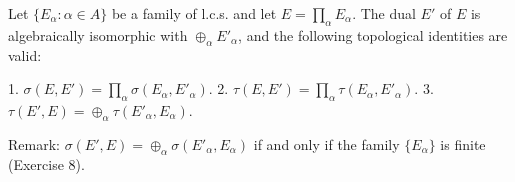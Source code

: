 Let $\{E_\alpha : \alpha \in A\}$ be a family of l.c.s. and let $E = \prod_\alpha E_\alpha$. The dual $E'$ of $E$ is algebraically isomorphic with $\oplus_\alpha E'_\alpha$, and the following topological identities are valid:

1. $\sigma(E, E') = \prod_\alpha \sigma(E_\alpha, E'_\alpha)$.
2. $\tau(E, E') = \prod_\alpha \tau(E_\alpha, E'_\alpha)$.
3. $\tau(E', E) = \oplus_\alpha \tau(E'_\alpha, E_\alpha)$.

Remark: $\sigma(E', E) = \oplus_\alpha \sigma(E'_\alpha, E_\alpha)$ if and only if the family $\{E_\alpha\}$ is finite (Exercise 8).

